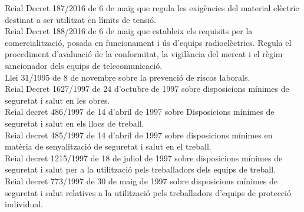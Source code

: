 \newline Reial Decret 187/2016 de 6 de maig que regula les exigències del material elèctric destinat a ser utilitzat en límits de tensió.\\
\newline Reial Decret 188/2016 de 6 de maig que estableix els requisits per la comercialització, posada en funcionament i ús d'equips radioelèctrics. Regula el procediment d'avaluació de la conformitat, la vigilància del mercat i el règim sancionador dels equips de telecomunicació.\\
\newline Llei 31/1995 de 8 de novembre sobre la prevenció de riscos laborals.\\
\newline Reial Decret 1627/1997 de 24 d'octubre de 1997 sobre disposicions mínimes de seguretat i salut en les obres.\\
\newline Reial decret 486/1997 de 14 d'abril de 1997 sobre Disposicions mínimes de seguretat i salut en els llocs de treball.\\
\newline Reial decret 485/1997 de 14 d'abril de 1997 sobre disposicions mínimes en matèria de senyalització de seguretat i salut en el treball.\\
\newline Reial decret 1215/1997 de 18 de juliol de 1997 sobre disposicions mínimes de seguretat i salut per a la utilització pels treballadors dels equips de treball.\\
\newline Reial decret 773/1997 de 30 de maig de 1997 sobre disposicions mínimes de seguretat i salut relatives a la utilització pels treballadors d'equips de protecció individual.


